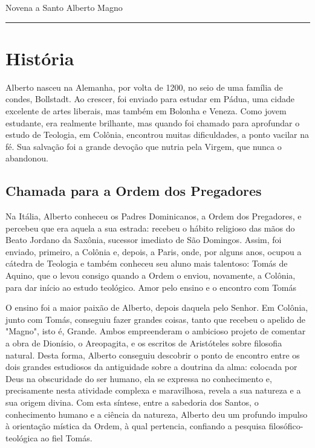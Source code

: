 \documentclass[a4paper,14pt,twoside]{extarticle} \usepackage[utf8]{inputenc}
\begin{document}
\begin{center}
  {\huge Novena a Santo Alberto Magno}
\end{center}




{\centering \rule{1.0\textwidth}{0.4pt}}

\tableofcontents
\thispagestyle{empty}


\newpage
\section{História}

Alberto nasceu na Alemanha, por volta de 1200, no seio de uma família de condes, Bollstadt. Ao crescer, foi enviado para estudar em Pádua, uma cidade excelente de artes liberais, mas também em Bolonha e Veneza.
Como jovem estudante, era realmente brilhante, mas quando foi chamado para aprofundar o estudo de Teologia, em Colônia, encontrou muitas dificuldades, a ponto vacilar na fé. Sua salvação foi a grande devoção que nutria pela Virgem, que nunca o abandonou.

\subsection{Chamada para a Ordem dos Pregadores}

Na Itália, Alberto conheceu os Padres Dominicanos, a Ordem dos Pregadores, e percebeu que era aquela a sua estrada: recebeu o hábito religioso das mãos do Beato Jordano da Saxônia, sucessor imediato de São Domingos. Assim, foi enviado, primeiro, a Colônia e, depois, a Paris, onde, por alguns anos, ocupou a cátedra de Teologia e também conheceu seu aluno mais talentoso: Tomás de Aquino, que o levou consigo quando a Ordem o enviou, novamente, a Colônia, para dar início ao estudo teológico.
Amor pelo ensino e o encontro com Tomás

O ensino foi a maior paixão de Alberto, depois daquela pelo Senhor. Em Colônia, junto com Tomás, conseguiu fazer grandes coisas, tanto que recebeu o apelido de "Magno", isto é, Grande. Ambos empreenderam o ambicioso projeto de comentar a obra de Dionísio, o Areopagita, e os escritos de Aristóteles sobre filosofia natural.
Desta forma, Alberto conseguiu descobrir o ponto de encontro entre os dois grandes estudiosos da antiguidade sobre a doutrina da alma: colocada por Deus na obscuridade do ser humano, ela se expressa no conhecimento e, precisamente nesta atividade complexa e maravilhosa, revela a sua natureza e a sua origem divina. Com esta síntese, entre a sabedoria dos Santos, o conhecimento humano e a ciência da natureza, Alberto deu um profundo impulso à orientação mística da Ordem, à qual pertencia, confiando a pesquisa filosófico-teológica ao fiel Tomás.
\end{document}
